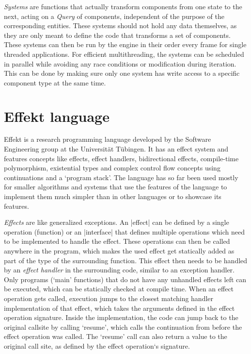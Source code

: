 \textit{Systems} are functions that actually transform components from one state to the next, acting on a \textit{Query} of components, independent of the purpose of the corresponding entities. These systems should not hold any data themselves, as they are only meant to define the code that transforms a set of components. These systems can then be run by the engine in their order every frame for single threaded applications. For efficient multithreading, the systems can be scheduled in parallel while avoiding any race conditions or modification during iteration. This can be done by making sure only one system has write access to a specific component type at the same time.

\section{Effekt language}

Effekt is a research programming language developed by the Software Engineering group at the Universität Tübingen. It has an effect system and features concepts like effects, effect handlers, bidirectional effects, compile-time polymorphism, existential types and complex control flow concepts using continuations and a `program stack'. The language has so far been used mostly for smaller algorithms and systems that use the features of the language to implement them much simpler than in other languages or to showcase its features.

\textit{Effects} are like generalized exceptions. An |effect| can be defined by a single operation (function) or an |interface| that defines multiple operations which need to be implemented to handle the effect. These operations can then be called anywhere in the program, which makes the used effect get statically added as part of the type of the surrounding function. This effect then needs to be handled by an \textit{effect handler} in the surrounding code, similar to an exception handler. Only programs (`main' functions) that do not have any unhandled effects left can be executed, which can be statically checked at compile time. When an effect operation gets called, execution jumps to the closest matching handler implementation of that effect, which takes the arguments defined in the effect operation signature. Inside the implementation, the code can jump back to the original callsite by calling `resume', which calls the continuation from before the effect operation was called. The `resume' call can also return a value to the original call site, as defined by the effect operation`s signature.

